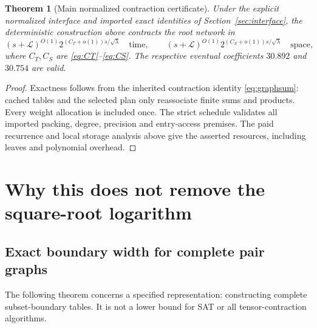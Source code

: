 \documentclass[11pt]{article}
\newtheorem{theorem}{Theorem}[section]
\theoremstyle{remark}\newtheorem{remark}[theorem]{Remark}
\begin{document}
\begin{theorem}[Main normalized contraction certificate]\label{thm:main}
Under the explicit normalized interface and imported exact identities of
Section~\ref{sec:interface}, the deterministic construction above contracts
the root network in
\[
 (s+\mathcal L)^{O(1)}2^{(C_T+o(1))s/\sqrt\lambda}
 \quad\text{time},\qquad
 (s+\mathcal L)^{O(1)}2^{(C_S+o(1))s/\sqrt\lambda}
 \quad\text{space},
\]
where $C_T,C_S$ are \eqref{eq:CT}--\eqref{eq:CS}.
The respective eventual coefficients $30.892$ and $30.754$ are valid.
\end{theorem}
\begin{proof}
Exactness follows from the inherited contraction identity
\eqref{eq:graphsum}: cached tables and the selected plan only reassociate
finite sums and products. Every weight allocation is included once.
The strict schedule validates all imported packing, degree, precision and
entry-access premises. The paid recurrence and local storage analysis above
give the asserted resources, including leaves and polynomial overhead.
\end{proof}

\section{Why this does not remove the square-root logarithm}
\label{sec:barrier}

\subsection{Exact boundary width for complete pair graphs}
The following theorem concerns a specified representation: constructing
complete subset-boundary tables. It is not a lower bound for SAT or all
tensor-contraction algorithms.
\end{document}
